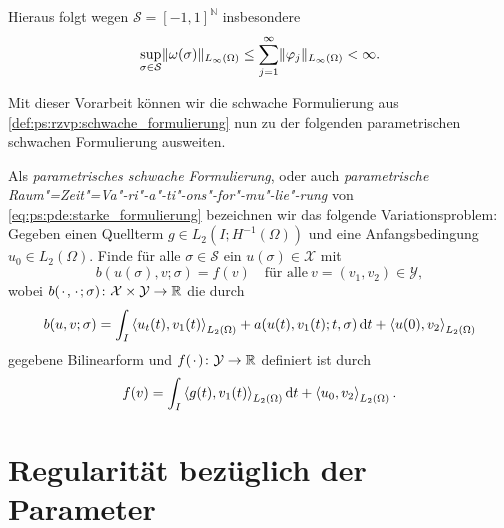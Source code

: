 Hieraus folgt wegen $\mathcal S = [-1, 1]^{\mathbb{N}}$ insbesondere
\begin{equation}
    \sup_{\sigma \in \mathcal S} \lVert\omega(\sigma)\rVert_{L_{\infty}(\Omega)} \leq \sum_{j = 1}^{\infty} \lVert\varphi_{j}\rVert_{L_{\infty}(\Omega)} < \infty.
\end{equation}

Mit dieser Vorarbeit können wir die schwache Formulierung aus \cref{def:ps:rzvp:schwache_formulierung} nun zu der folgenden parametrischen schwachen Formulierung ausweiten.


\begin{Definition}
\label{def:ps:pf:schwache_formulierung}
    Als \emph{parametrisches schwache Formulierung}, oder auch \emph{parametrische Raum"=Zeit"=Va"-ri"-a"-ti"-ons"-for"-mu"-lie"-rung} von \cref{eq:ps:pde:starke_formulierung} bezeichnen wir das folgende Variationsproblem:
    Gegeben einen Quellterm $g \in L_{2}(I; H^{-1}(\Omega))$ und eine Anfangsbedingung $u_{0} \in L_{2}(\Omega)$.
    Finde für alle $\sigma \in \mathcal S$ ein $u(\sigma) \in \mathcal X$ mit
    \begin{equation}
        \label{eq:ps:pf:schwache_formulierung}
        b(u(\sigma), v; \sigma) = f(v) \quad \text{für alle}~v = (v_{1}, v_{2}) \in \mathcal Y,
    \end{equation}
    wobei $b({\mkern2mu\cdot\mkern2mu}, {\mkern2mu\cdot\mkern2mu}; \sigma) \colon \mathcal X \times \mathcal Y \to \mathbb{R}$ die durch
    \begin{equation}
        \label{eq:ps:pf:schwache_formulierung_lhs_b}
        b(u, v; \sigma)
            = \int_{I} \left\langle u_{t}(t),v_{1}(t)\right\rangle_{L_{2}(\Omega)} + a(u(t), v_{1}(t); t, \sigma) \mathop{}\!\mathrm{d} t + \left\langle u(0),v_{2}\right\rangle_{L_{2}(\Omega)}
    \end{equation}
    gegebene Bilinearform und $f({\mkern2mu\cdot\mkern2mu}) \colon \mathcal Y \to \mathbb{R}$ definiert ist durch
    \begin{equation}
        \label{eq:ps:pf:schwache_formulierung_rhs_f}
        f(v) = \int_{I} \left\langle g(t),v_{1}(t)\right\rangle_{L_{2}(\Omega)} \mathop{}\!\mathrm{d} t + \left\langle u_{0},v_{2}\right\rangle_{L_{2}(\Omega)}.
    \end{equation}
\end{Definition}



\section{Regularität bezüglich der Parameter} %
\label{sec:ps:rg:regularitaet_bezueglich_der_parameter}

